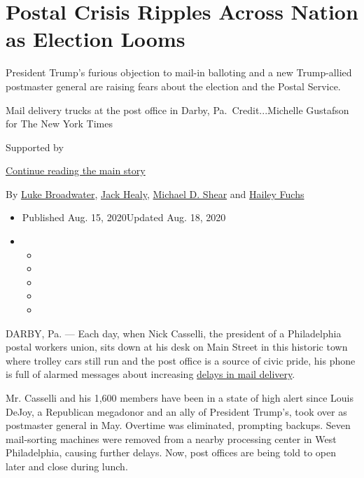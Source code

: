 \hypertarget{postal-crisis-ripples-across-nation-as-election-looms}{%
\section{Postal Crisis Ripples Across Nation as Election
Looms}\label{postal-crisis-ripples-across-nation-as-election-looms}}

President Trump's furious objection to mail-in balloting and a new
Trump-allied postmaster general are raising fears about the election and
the Postal Service.

Mail delivery trucks at the post office in Darby, Pa.~Credit...Michelle
Gustafson for The New York Times

Supported by

\protect\hyperlink{after-sponsor}{Continue reading the main story}

By \href{https://www.nytimes3xbfgragh.onion/by/luke-broadwater}{Luke
Broadwater},
\href{https://www.nytimes3xbfgragh.onion/by/jack-healy}{Jack Healy},
\href{https://www.nytimes3xbfgragh.onion/by/michael-d-shear}{Michael D.
Shear} and
\href{https://www.nytimes3xbfgragh.onion/by/hailey-fuchs}{Hailey Fuchs}

\begin{itemize}
\item
  Published Aug. 15, 2020Updated Aug. 18, 2020
\item
  \begin{itemize}
  \item
  \item
  \item
  \item
  \item
  \end{itemize}
\end{itemize}

DARBY, Pa. --- Each day, when Nick Casselli, the president of a
Philadelphia postal workers union, sits down at his desk on Main Street
in this historic town where trolley cars still run and the post office
is a source of civic pride, his phone is full of alarmed messages about
increasing
\href{https://www.nytimes3xbfgragh.onion/2020/08/21/us/postal-service-mail-rural.html}{delays
in mail delivery}.

Mr. Casselli and his 1,600 members have been in a state of high alert
since Louis DeJoy, a Republican megadonor and an ally of President
Trump's, took over as postmaster general in May. Overtime was
eliminated, prompting backups. Seven mail-sorting machines were removed
from a nearby processing center in West Philadelphia, causing further
delays. Now, post offices are being told to open later and close during
lunch.


